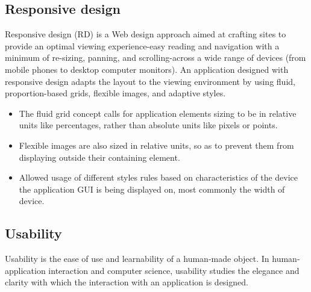 \subsection {Responsive design}
	Responsive design (RD)\cite{ wiki:RWD, CSS3} is a Web design approach aimed at crafting sites to provide an optimal viewing experience-easy reading and navigation with a minimum of re-sizing, panning, and scrolling-across a wide range of devices (from mobile phones to desktop computer monitors). An application designed with responsive design\cite{pettit, ethan} adapts the layout to the viewing environment by using fluid, proportion-based grids, flexible images, and adaptive styles.
    \begin{itemize}
	\item The fluid grid concept calls for application elements sizing to be in relative units like percentages, rather than absolute units like pixels or points. 
	\item Flexible images are also sized in relative units, so as to prevent them from displaying outside their containing element. 
	\item Allowed usage of different styles rules based on characteristics of the device the application GUI is being displayed on, most commonly the width of device. 
	\end{itemize}

\subsection {Usability}
     Usability is the ease of use and learnability of a human-made object. In human-application interaction and computer science, usability studies the elegance and clarity with which the interaction with an application is designed.

